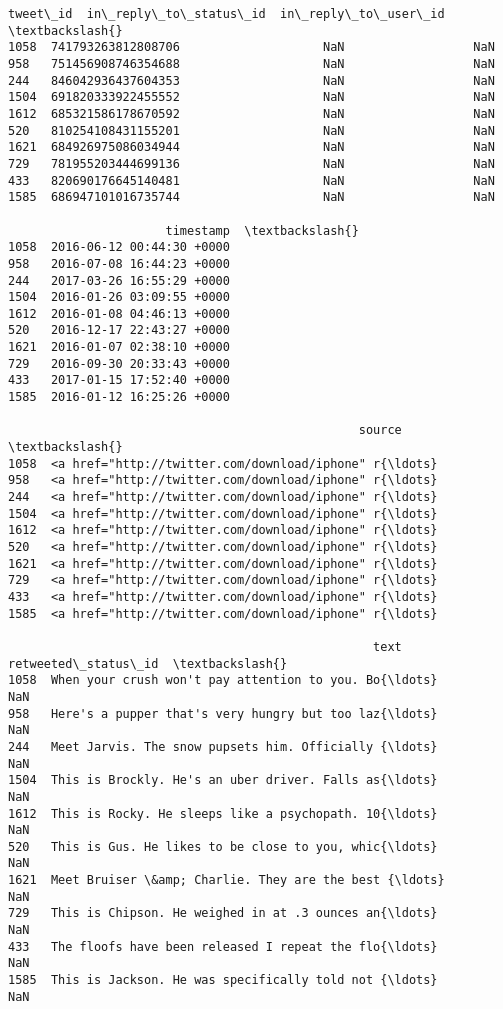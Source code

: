 \documentclass[11pt]{article}
\makeatletter
\newcommand{\boxspacing}{\kern\kvtcb@left@rule\kern\kvtcb@boxsep}
\newcommand{\prompt}[4]{
        \ttfamily\llap{{\color{#2}[#3]:\hspace{3pt}#4}}\vspace{-\baselineskip}
    }
\makeatother
\begin{document}
            \begin{tcolorbox}[breakable, size=fbox, boxrule=.5pt, pad at break*=1mm, opacityfill=0]
\prompt{Out}{outcolor}{92}{\boxspacing}
\begin{Verbatim}[commandchars=\\\{\}]
                tweet\_id  in\_reply\_to\_status\_id  in\_reply\_to\_user\_id  \textbackslash{}
1058  741793263812808706                    NaN                  NaN
958   751456908746354688                    NaN                  NaN
244   846042936437604353                    NaN                  NaN
1504  691820333922455552                    NaN                  NaN
1612  685321586178670592                    NaN                  NaN
520   810254108431155201                    NaN                  NaN
1621  684926975086034944                    NaN                  NaN
729   781955203444699136                    NaN                  NaN
433   820690176645140481                    NaN                  NaN
1585  686947101016735744                    NaN                  NaN

                      timestamp  \textbackslash{}
1058  2016-06-12 00:44:30 +0000
958   2016-07-08 16:44:23 +0000
244   2017-03-26 16:55:29 +0000
1504  2016-01-26 03:09:55 +0000
1612  2016-01-08 04:46:13 +0000
520   2016-12-17 22:43:27 +0000
1621  2016-01-07 02:38:10 +0000
729   2016-09-30 20:33:43 +0000
433   2017-01-15 17:52:40 +0000
1585  2016-01-12 16:25:26 +0000

                                                 source  \textbackslash{}
1058  <a href="http://twitter.com/download/iphone" r{\ldots}
958   <a href="http://twitter.com/download/iphone" r{\ldots}
244   <a href="http://twitter.com/download/iphone" r{\ldots}
1504  <a href="http://twitter.com/download/iphone" r{\ldots}
1612  <a href="http://twitter.com/download/iphone" r{\ldots}
520   <a href="http://twitter.com/download/iphone" r{\ldots}
1621  <a href="http://twitter.com/download/iphone" r{\ldots}
729   <a href="http://twitter.com/download/iphone" r{\ldots}
433   <a href="http://twitter.com/download/iphone" r{\ldots}
1585  <a href="http://twitter.com/download/iphone" r{\ldots}

                                                   text  retweeted\_status\_id  \textbackslash{}
1058  When your crush won't pay attention to you. Bo{\ldots}                  NaN
958   Here's a pupper that's very hungry but too laz{\ldots}                  NaN
244   Meet Jarvis. The snow pupsets him. Officially {\ldots}                  NaN
1504  This is Brockly. He's an uber driver. Falls as{\ldots}                  NaN
1612  This is Rocky. He sleeps like a psychopath. 10{\ldots}                  NaN
520   This is Gus. He likes to be close to you, whic{\ldots}                  NaN
1621  Meet Bruiser \&amp; Charlie. They are the best {\ldots}                  NaN
729   This is Chipson. He weighed in at .3 ounces an{\ldots}                  NaN
433   The floofs have been released I repeat the flo{\ldots}                  NaN
1585  This is Jackson. He was specifically told not {\ldots}                  NaN


\end{Verbatim}
\end{tcolorbox}
\end{document}
